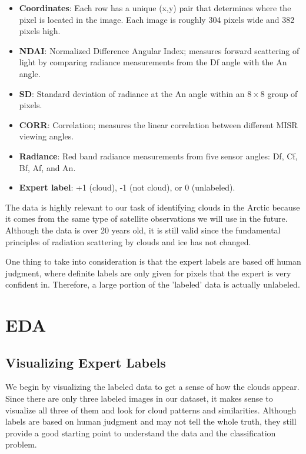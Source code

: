\documentclass[10pt,letterpaper]{article}
\begin{document}
\begin{itemize}
    \item \textbf{Coordinates}: Each row has a unique (x,y) pair that determines where the pixel is located in the image. Each image is roughly 304 pixels wide and 382 pixels high.
    \item \textbf{NDAI}: Normalized Difference Angular Index; measures forward scattering of light by comparing radiance measurements from the Df angle with the An angle.
    \item \textbf{SD}: Standard deviation of radiance at the An angle within an $8 \times 8$ group of pixels.
    \item \textbf{CORR}: Correlation; measures the linear correlation between different MISR viewing angles.
    \item \textbf{Radiance}: Red band radiance measurements from five sensor angles: Df, Cf, Bf, Af, and An.
    \item \textbf{Expert label}: +1 (cloud), -1 (not cloud), or 0 (unlabeled).
\end{itemize}

The data is highly relevant to our task of identifying clouds in the Arctic because it comes from the same type of satellite observations we will use in the future. Although the data is over 20 years old, it is still valid since the fundamental principles of radiation scattering by clouds and ice has not changed.

One thing to take into consideration is that the expert labels are based off human judgment, where definite labels are only given for pixels that the expert is very confident in. Therefore, a large portion of the 'labeled' data is actually unlabeled.

\section{EDA}

\subsection{Visualizing Expert Labels}

We begin by visualizing the labeled data to get a sense of how the clouds appear. Since there are only three labeled images in our dataset, it makes sense to visualize all three of them and look for cloud patterns and similarities. Although labels are based on human judgment and may not tell the whole truth, they still provide a good starting point to  understand the data and the classification problem.
\end{document}
